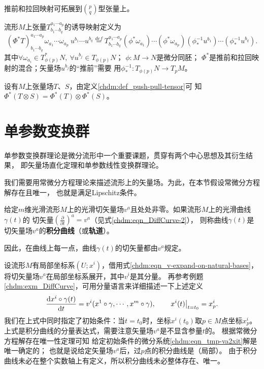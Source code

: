 推前和拉回映射可拓展到$\binom{p}{q}$型张量上。
\begin{definition}\label{chdm:def_push-pull-tensor}
    流形$M$上张量$T_{b_1\cdots b_q}^{a_1\cdots a_p}$的诱导映射定义为
    \begin{equation*}
        (\Phi^{*}T)_{b_1\cdots b_q}^{a_1\cdots a_p} \omega_{a_1}\cdots \omega_{a_p}\  u^{b_1} \cdots u^{b_q}
        \overset{def}{=} T_{b_1\cdots b_q}^{a_1\cdots a_p}
        (\phi^{*}\omega_{a_1})\cdots (\phi^{*}\omega_{a_p})
        (\phi_{*}^{-1}u^{b_1})\cdots (\phi_{*}^{-1}u^{b_q}) .
    \end{equation*}
    其中$\forall \omega_{a_i} \in T^{*}_{\phi(p)}N,\ \forall u^{b_j} \in T_{\phi(p)}N$；
    $\phi:M\to N$是微分同胚；
    $\Phi^{*}$是推前和拉回映射的混合；矢量场$u^{b_j}$的“推前”需要
    用$\phi_{*}^{-1}:T_{\phi(p)}N\to T_p M$。
\end{definition}

\begin{proposition}\label{chdm:thm_pptt}
    设有$M$上张量场$T$、$S$，由定义\ref{chdm:def_push-pull-tensor}可
    知$\Phi^{*}(T\otimes S) = \Phi^{*}(T) \otimes \Phi^{*}(S)$。
\end{proposition}


\section{单参数变换群}\label{chdm:sec_One-Parameter-Transformations-Groups}
单参数变换群理论是微分流形中一个重要课题，贯穿有两个中心思想及其衍生结果，
即矢量场直化定理和单参数线性变换群理论。

我们需要用常微分方程理论来描述流形上的矢量场。为此，在本节假设常微分方程解存在且唯一，
也就是满足Lipschitz条件\cite[\S 31]{arnold-2001-ode}。

\begin{definition}
    给定$m$维光滑流形$M$上的光滑切矢量场$v^a$且处处非零。如果流形$M$上的光滑曲线$\gamma(t)$的
    切矢量$(\frac{\partial}{\partial t})^a = v^a$（见式\eqref{chdm:eqn_DiffCurve-2}），
    则称曲线$\gamma(t)$是切矢量场$v^a$的\textbf{积分曲线}（或\textbf{轨道}）。
\end{definition}
因此，在曲线上每一点，曲线$\gamma(t)$的切矢量都由$v^a$规定。

设流形$M$有局部坐标系$(U;x^i)$，借用式\eqref{chdm:eqn_v-expand-on-natural-bases}，
将切矢量场$v^a$在局部坐标系展开，其中$v^i$是其分量。
再参考例题\ref{chdm:exm_DiffCurve}，可用分量语言来详细描述一下上述定义
\begin{equation}\label{chdm:eqn_tmp-va2xit}
    \frac{{\rm d} x^i\circ\gamma(t)}{{\rm d} t}=v^i(x^1\circ\gamma,\cdots,x^m\circ\gamma), 
    \qquad \left. x^i(t) \right|_{t=t_0} = x^i_p  . 
\end{equation}
我们在上式中同时指定了初始条件：当$t=t_0$时，坐标$x^i(t_0)$取$p\in M$点坐标$x^i_p$。
上式是积分曲线的分量表达式，需要注意矢量场$v^a$是不显含参量$t$的。
根据常微分方程解存在唯一性定理\cite[\S 31]{arnold-2001-ode}可知
给定初始条件的微分系统\eqref{chdm:eqn_tmp-va2xit}解是唯一确定的；
也就是说给定矢量场$v^a$后，过$p$点的积分曲线是（局部）。
由于积分曲线未必在整个实数轴上有定义，所以积分曲线未必整体存在、唯一。

